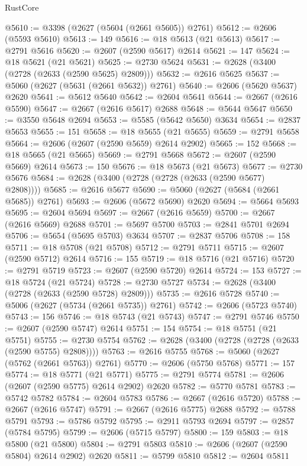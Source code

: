 \begin{lexlean}{RustCore}
\begin{coremodule}
@5610 := @3398 (@2627 (@5604 (@2661 @5605)) @2761)
@5612 := @2606 (@5593 @5610)
@5613 := 149
@5616 := @18 @5613 (@21 @5613)
@5617 := @2791 @5616
@5620 := @2607 (@2590 @5617) @2614
@5621 := 147
@5624 := @18 @5621 (@21 @5621)
@5625 := @2730 @5624
@5631 := @2628 (@3400 (@2728 (@2633 (@2590 @5625) @2809)))
@5632 := @2616 @5625
@5637 := @5060 (@2627 (@5631 (@2661 @5632)) @2761)
@5640 := @2606 (@5620 @5637) @2620
@5641 := @5612 @5640
@5642 := @2604 @5641
@5644 := @2667 (@2616 @5590)
@5647 := @2667 (@2616 @5617) @2688
@5648 := @5644 @5647
@5650 := @3550 @5648 @2694
@5653 := @5585 (@5642 @5650) @3634
@5654 := @2837 @5653
@5655 := 151
@5658 := @18 @5655 (@21 @5655)
@5659 := @2791 @5658
@5664 := @2606 (@2607 (@2590 @5659) @2614 @2902)
@5665 := 152
@5668 := @18 @5665 (@21 @5665)
@5669 := @2791 @5668
@5672 := @2607 (@2590 @5669) @2614
@5673 := 150
@5676 := @18 @5673 (@21 @5673)
@5677 := @2730 @5676
@5684 := @2628 (@3400 (@2728 (@2728 (@2633 (@2590 @5677) @2808))))
@5685 := @2616 @5677
@5690 := @5060 (@2627 (@5684 (@2661 @5685)) @2761)
@5693 := @2606 (@5672 @5690) @2620
@5694 := @5664 @5693
@5695 := @2604 @5694
@5697 := @2667 (@2616 @5659)
@5700 := @2667 (@2616 @5669) @2688
@5701 := @5697 @5700
@5703 := @2841 @5701 @2694
@5706 := @5654 (@5695 @5703) @3634
@5707 := @2837 @5706
@5708 := 158
@5711 := @18 @5708 (@21 @5708)
@5712 := @2791 @5711
@5715 := @2607 (@2590 @5712) @2614
@5716 := 155
@5719 := @18 @5716 (@21 @5716)
@5720 := @2791 @5719
@5723 := @2607 (@2590 @5720) @2614
@5724 := 153
@5727 := @18 @5724 (@21 @5724)
@5728 := @2730 @5727
@5734 := @2628 (@3400 (@2728 (@2633 (@2590 @5728) @2809)))
@5735 := @2616 @5728
@5740 := @5006 (@2627 (@5734 (@2661 @5735)) @2761)
@5742 := @2606 (@5723 @5740)
@5743 := 156
@5746 := @18 @5743 (@21 @5743)
@5747 := @2791 @5746
@5750 := @2607 (@2590 @5747) @2614
@5751 := 154
@5754 := @18 @5751 (@21 @5751)
@5755 := @2730 @5754
@5762 := @2628 (@3400 (@2728 (@2728 (@2633 (@2590 @5755) @2808))))
@5763 := @2616 @5755
@5768 := @5060 (@2627 (@5762 (@2661 @5763)) @2761)
@5770 := @2606 (@5750 @5768)
@5771 := 157
@5774 := @18 @5771 (@21 @5771)
@5775 := @2791 @5774
@5781 := @2606 (@2607 (@2590 @5775) @2614 @2902) @2620
@5782 := @5770 @5781
@5783 := @5742 @5782
@5784 := @2604 @5783
@5786 := @2667 (@2616 @5720)
@5788 := @2667 (@2616 @5747)
@5791 := @2667 (@2616 @5775) @2688
@5792 := @5788 @5791
@5793 := @5786 @5792
@5795 := @2911 @5793 @2694
@5797 := @2857 (@5784 @5795)
@5799 := @2606 (@5715 @5797)
@5800 := 159
@5803 := @18 @5800 (@21 @5800)
@5804 := @2791 @5803
@5810 := @2606 (@2607 (@2590 @5804) @2614 @2902) @2620
@5811 := @5799 @5810
@5812 := @2604 @5811

\end{coremodule}
\end{lexlean}
